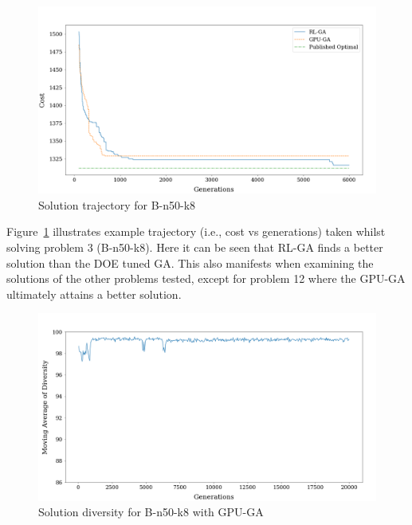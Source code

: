 \documentclass[acmsmall]{acmart}
\begin{document}
\begin{figure}[t] 
\begin{centering}
\includegraphics[scale=0.17 , trim={0 0 0 70},clip]{figs/Cost vs Generations 50 nodes.png}
\par\end{centering}
\begin{centering}
\caption{Solution trajectory for B-n50-k8}\label{fig:solnbn50}
\par\end{centering}
\end{figure}

Figure~\ref{fig:solnbn50} illustrates example trajectory (i.e., cost vs generations) taken whilst solving problem 3 (B-n50-k8). Here it can be seen that RL-GA finds a better solution than the DOE tuned GA. This also manifests when examining the solutions of the other problems tested, except for problem 12 where the GPU-GA ultimately attains a better solution.

\begin{figure}[h] 
\begin{centering}
\includegraphics[scale=0.17]{figs/moving average diversity GPU-GA2.png}
\par\end{centering}
\begin{centering}
\caption{Solution diversity for B-n50-k8 with GPU-GA }\label{fig:diversityGPUGA50}
\par\end{centering}
\end{figure}
\end{document}
